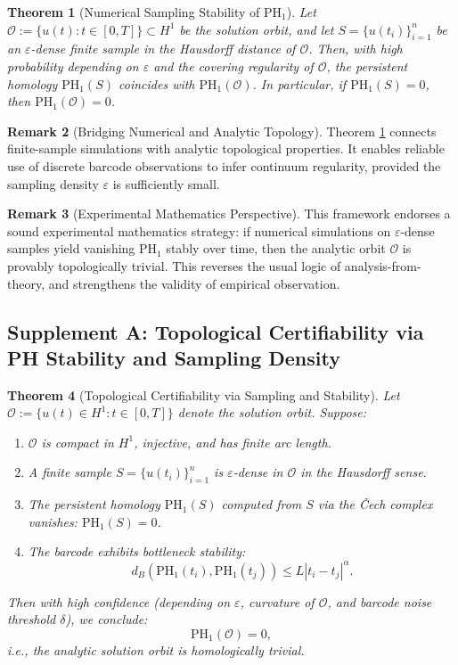 \documentclass[11pt]{article}
\newtheorem{theorem}{Theorem}[section]
\theoremstyle{definition}
\newtheorem{remark}[theorem]{Remark}
\begin{document}
\begin{theorem}[Numerical Sampling Stability of $\mathrm{PH}_1$]
\label{thm:niyogi_smale_weinberger}
Let $\mathcal{O} := \{u(t): t \in [0,T]\} \subset H^1$ be the solution orbit, and let $S = \{u(t_i)\}_{i=1}^n$ be an $\varepsilon$-dense finite sample in the Hausdorff distance of $\mathcal{O}$. Then, with high probability depending on $\varepsilon$ and the covering regularity of $\mathcal{O}$, the persistent homology $\mathrm{PH}_1(S)$ coincides with $\mathrm{PH}_1(\mathcal{O})$. In particular, if $\mathrm{PH}_1(S) = 0$, then $\mathrm{PH}_1(\mathcal{O}) = 0$.
\end{theorem}

\begin{remark}[Bridging Numerical and Analytic Topology]
Theorem \ref{thm:niyogi_smale_weinberger} connects finite-sample simulations with analytic topological properties. It enables reliable use of discrete barcode observations to infer continuum regularity, provided the sampling density $\varepsilon$ is sufficiently small.
\end{remark}

\begin{remark}[Experimental Mathematics Perspective]
This framework endorses a sound experimental mathematics strategy: if numerical simulations on $\varepsilon$-dense samples yield vanishing $\mathrm{PH}_1$ stably over time, then the analytic orbit $\mathcal{O}$ is provably topologically trivial. This reverses the usual logic of analysis-from-theory, and strengthens the validity of empirical observation.
\end{remark}

\subsection*{Supplement A: Topological Certifiability via PH Stability and Sampling Density}

\begin{theorem}[Topological Certifiability via Sampling and Stability]
\label{thm:certifiability}
Let $\mathcal{O} := \{ u(t) \in H^1 : t \in [0,T] \}$ denote the solution orbit. Suppose:
\begin{enumerate}
    \item $\mathcal{O}$ is compact in $H^1$, injective, and has finite arc length.
    \item A finite sample $S = \{ u(t_i) \}_{i=1}^n$ is $\varepsilon$-dense in $\mathcal{O}$ in the Hausdorff sense.
    \item The persistent homology $\mathrm{PH}_1(S)$ computed from $S$ via the Čech complex vanishes: $\mathrm{PH}_1(S) = 0$.
    \item The barcode exhibits bottleneck stability:
    \[
    d_B(\mathrm{PH}_1(t_i), \mathrm{PH}_1(t_j)) \leq L|t_i - t_j|^\alpha.
    \]
\end{enumerate}
Then with high confidence (depending on $\varepsilon$, curvature of $\mathcal{O}$, and barcode noise threshold $\delta$), we conclude:
\[
\mathrm{PH}_1(\mathcal{O}) = 0,
\]
i.e., the analytic solution orbit is homologically trivial.
\end{theorem}
\end{document}
